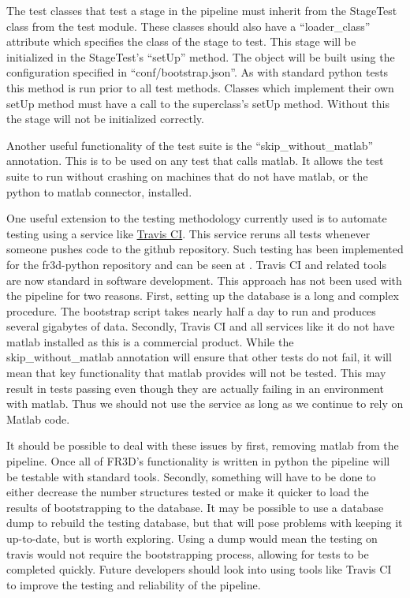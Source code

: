The test classes that test a stage in the pipeline must inherit from the
StageTest class from the test module. These classes should also have a
``loader\_class'' attribute which specifies the class of the stage to test. This
stage will be initialized in the StageTest's ``setUp'' method. The object will be
built using the configuration specified in ``conf/bootstrap.json''. As with
standard python tests this method is run prior to all test methods. Classes
which implement their own setUp method must have a call to the superclass's
setUp method. Without this the stage will not be initialized correctly.

Another useful functionality of the test suite is the ``skip\_without\_matlab''
annotation. This is to be used on any test that calls matlab. It allows the test
suite to run without crashing on machines that do not have matlab, or the python
to matlab connector, installed.

One useful extension to the testing methodology currently used is to automate
testing using a service like \href{https://travis-ci.org/}{Travis CI}. This
service reruns all tests whenever someone pushes code to the github repository.
Such testing has been implemented for the fr3d-python repository and can be seen
at
.
Travis CI and related tools are now standard in software development. This
approach has not been used with the pipeline for two reasons. First, setting up
the database is a long and complex procedure. The bootstrap script takes nearly
half a day to run and produces several gigabytes of data. Secondly, Travis CI
and all services like it do not have matlab installed as this is a commercial
product. While the skip\_without\_matlab annotation will ensure that other tests
do not fail, it will mean that key functionality that matlab provides will not
be tested. This may result in tests passing even though they are actually
failing in an environment with matlab. Thus we should not use the service as
long as we continue to rely on Matlab code.

It should be possible to deal with these issues by first, removing matlab from
the pipeline. Once all of FR3D's functionality is written in python the pipeline
will be testable with standard tools. Secondly, something will have to be done
to either decrease the number structures tested or make it quicker to load the
results of bootstrapping to the database. It may be possible to use a database
dump to rebuild the testing database, but that will pose problems with keeping
it up-to-date, but is worth exploring. Using a dump would mean the testing on
travis would not require the bootstrapping process, allowing for tests to be
completed quickly. Future developers should look into using tools like Travis CI
to improve the testing and reliability of the pipeline.
